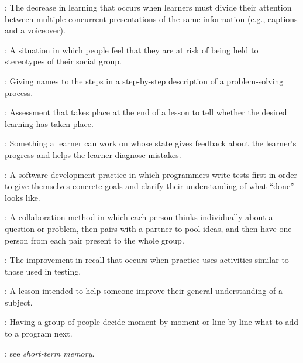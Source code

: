 \begin{description}
: The
decrease in learning that occurs when learners must divide their
attention between multiple concurrent presentations of the same
information (e.g., captions and a voiceover).

: A situation in
which people feel that they are at risk of being held to stereotypes of
their social group.

: Giving names to the
steps in a step-by-step description of a problem-solving process.

: Assessment
that takes place at the end of a lesson to tell whether the desired
learning has taken place.

: Something a learner
can work on whose state gives feedback about the learner's progress and
helps the learner diagnose mistakes.

: A
software development practice in which programmers write tests first in
order to give themselves concrete goals and clarify their understanding
of what ``done'' looks like.

: A collaboration
method in which each person thinks individually about a question or
problem, then pairs with a partner to pool ideas, and then have one
person from each pair present to the whole group.

:
The improvement in recall that occurs when practice uses activities
similar to those used in testing.

: A lesson intended to help someone improve their
general understanding of a subject.

: Having a group of people
decide moment by moment or line by line what to add to a program next.

: see \emph{short-term memory}.

\end{description}
